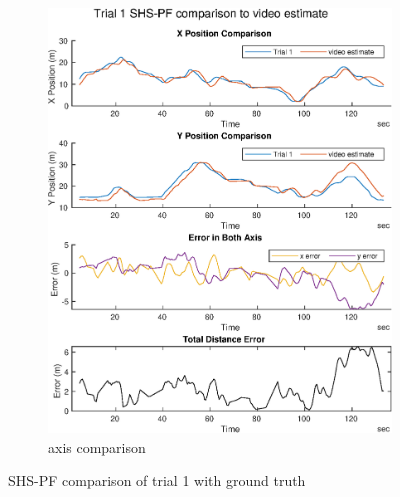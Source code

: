 \begin{figure}[H]
\begin{subfigure}[t]{.45\textwidth}
		\includegraphics[width=\linewidth]{images/20201118_1900_trial1_output_1}
		\caption{axis comparison}
		\label{fig:shspf_trial1_comparison}
	\end{subfigure}
	\setlength{\belowcaptionskip}{-20pt}
	\caption{SHS-PF comparison of trial 1 with ground truth}
	\label{fig:shspf_trial1_shs_gt_comparison}
\end{figure}
